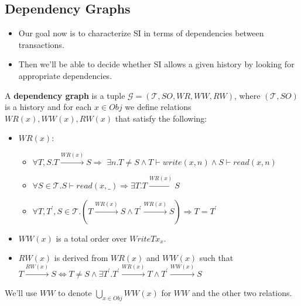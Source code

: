 \documentclass{beamer}
\begin{document}
\subsection{Dependency Graphs}

\begin{frame}
	\begin{itemize}
		\item Our goal now is to characterize SI in terms of dependencies between transactions.
		\item Then we'll be able to decide whether SI allows a given history by looking for appropriate dependencies.
	\end{itemize}
\end{frame}


\begin{frame}
\begin{definition}
	A \textbf{dependency graph} is a tuple $\mathcal{G} = (\mathcal{T}, SO, WR, WW, RW)$, where $(\mathcal{T}, SO)$ is a history and for each $x \in Obj$ we define relations $WR(x), WW(x), RW(x)$ that satisfy the following:
	\begin{itemize}
		\item $WR(x)$:
		\begin{itemize}
			\item $\forall T,S. T \xrightarrow{WR(x)}S \Rightarrow $ 
			$	\exists n. T \ne S \wedge T \vdash write(x,n) \wedge S \vdash read(x,n)$
			\item $\forall S \in \mathcal{T}. S \vdash read(x,\_) \Rightarrow \exists T. T \xrightarrow{WR(x)} S $
			\item $\forall T, T^\prime, S \in \mathcal{T}. \left( T \xrightarrow{WR(x)} S \wedge T^\prime \xrightarrow{WR(x)} S \right) \Rightarrow T = T^\prime $
		\end{itemize}
		\item $WW(x)$ is a total order over $WriteTx_x$.
		\item $RW(x)$ is derived from $WR(x)$ and $WW(x)$ such that $T \xrightarrow{RW(x)} S \Leftrightarrow
		T \ne S \wedge \exists T^\prime . T^\prime \xrightarrow{WR(x)}T \wedge T^\prime \xrightarrow{WW(x)}S$
	\end{itemize}
\end{definition}
	We'll use $WW$ to denote $\bigcup_{x\in Obj}WW(x)$ for $WW$ and the other two relations.
\end{frame}
\end{document}
